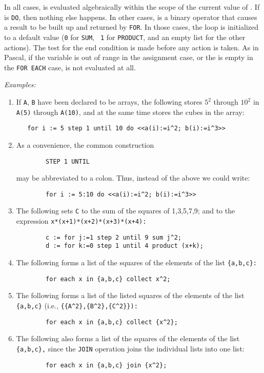 In all cases,  is evaluated algebraically within the
scope of the current value of .  If  is
\texttt{DO}, then nothing else happens.  In other cases, 
is a binary operator that causes a result to be built up and
returned by \texttt{FOR}.  In those cases, the loop is
initialized to a default value (\texttt{0} for \texttt{SUM}, {\tt
1} for \texttt{PRODUCT}, and an empty list for the other
actions).  The test for the end condition is made before any action is
taken.  As in Pascal, if the variable is out of range in the assignment
case, or the  is empty in the \texttt{FOR EACH}
case,  is not evaluated at all.

\textit{Examples:}
\begin{enumerate}
\item If \texttt{A}, \texttt{B} have been declared to be arrays, the following
stores $5^{2}$ through $10^{2}$ in \texttt{A(5)} through \texttt{A(10)}, and at
the same time stores the cubes in the  array:
\begin{verbatim}
   for i := 5 step 1 until 10 do <<a(i):=i^2; b(i):=i^3>>
\end{verbatim}
\item As a convenience, the common construction
\begin{verbatim}
        STEP 1 UNTIL
\end{verbatim}
may be abbreviated to a colon. Thus, instead of the above we could write:
\begin{verbatim}
        for i := 5:10 do <<a(i):=i^2; b(i):=i^3>>
\end{verbatim}
\item The following sets \texttt{C} to the sum of the squares of 1,3,5,7,9;
and  to the expression \texttt{x*(x+1)*(x+2)*(x+3)*(x+4):}
\begin{verbatim}
        c := for j:=1 step 2 until 9 sum j^2;
        d := for k:=0 step 1 until 4 product (x+k);
\end{verbatim}
\item The following forms a list of the squares of the elements of the list
\texttt{\{a,b,c\}:}
\begin{verbatim}
        for each x in {a,b,c} collect x^2;
\end{verbatim}
\item The following forms a list of the listed squares of the elements of the
list \texttt{\{a,b,c\}}
(i.e., \texttt{\{\{A\textasciicircum 2\},\{B\textasciicircum 2\},\{C\textasciicircum 2\}\}):}
\begin{verbatim}
        for each x in {a,b,c} collect {x^2};
\end{verbatim}
\item The following also forms a list of the squares of the elements of
the list \texttt{\{a,b,c\},} since the \texttt{JOIN} operation joins the
individual lists into one list:
\begin{verbatim}
        for each x in {a,b,c} join {x^2};
\end{verbatim}
\end{enumerate}
